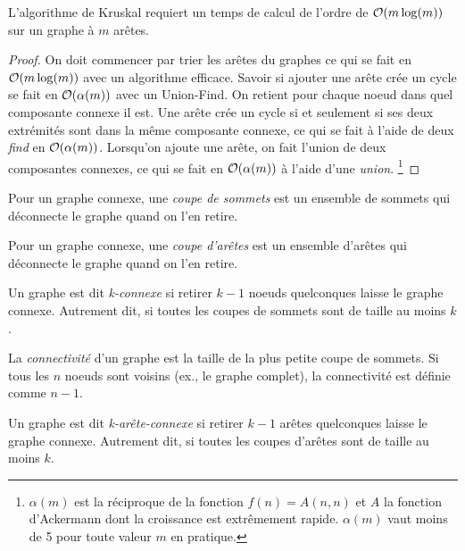 \begin{mytheo} 
  L'algorithme de Kruskal requiert un temps de calcul de l'ordre de $\mathcal{O}(m\log(m))$ sur un graphe à $m$ arêtes.
  \begin{proof}
    On doit commencer par trier les arêtes du graphes ce qui se fait en $\mathcal{O}(m\log(m))$ avec un algorithme efficace.
    Savoir si ajouter une arête crée un cycle se fait en $\mathcal{O}(\alpha(m))$ avec un Union-Find.
    On retient pour chaque noeud dans quel composante connexe il est.
    Une arête crée un cycle si et seulement si ses deux extrémités sont dans la même composante connexe,
    ce qui se fait à l'aide de deux \emph{find} en $\mathcal{O}(\alpha(m))$.
    Lorsqu'on ajoute une arête, on fait l'union de deux composantes connexes,
    ce qui se fait en $\mathcal{O}(\alpha(m))$ à l'aide d'une \emph{union}.
    \footnote{$\alpha(m)$ est la réciproque de la fonction $f(n) = A(n,n)$ et
    $A$ la fonction d'Ackermann dont la croissance est extrêmement rapide.
    $\alpha(m)$ vaut moins de 5 pour toute valeur $m$ en pratique.}
  \end{proof}
\end{mytheo}

\begin{mydef}
  Pour un graphe connexe, une \emph{coupe de sommets} est un ensemble de sommets qui déconnecte le graphe quand on l'en retire.
\end{mydef}

\begin{mydef}
  Pour un graphe connexe, une \emph{coupe d'arêtes} est un ensemble d'arêtes qui déconnecte le graphe quand on l'en retire.
\end{mydef}

\begin{mydef}
  Un graphe est dit \emph{k-connexe} si retirer $k − 1$ noeuds quelconques laisse le graphe connexe. Autrement dit, si toutes les coupes de sommets sont de taille au moins $k$.
\end{mydef}

\begin{mydef}
   La \emph{connectivité} d'un graphe est la taille de la plus petite coupe de sommets. Si tous les $n$ noeuds sont voisins (ex., le graphe complet), la connectivité est définie comme $n − 1$.
\end{mydef}

\begin{mydef}
   Un graphe est dit \emph{k-arête-connexe} si retirer $k − 1$ arêtes quelconques laisse le graphe connexe. Autrement dit, si toutes les coupes d'arêtes sont de taille au moins $k$.
\end{mydef}

